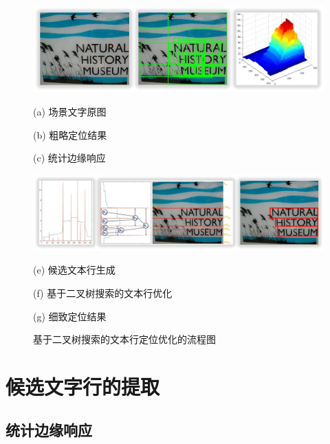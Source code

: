     \begin{figure}[!h]
    \centering
    \includegraphics[width=\textwidth]{./figures/c4_overview_1.jpg}
    \begin{minipage}[t]{0.23\linewidth}
    \centerline{ \small (a) 场景文字原图}
    \end{minipage}
    \begin{minipage}[t]{0.43\linewidth}
    \centerline{ \small (b) 粗略定位结果}
    \end{minipage}
    \begin{minipage}[t]{0.23\linewidth}
    \centerline{ \small (c) 统计边缘响应}
    \end{minipage}
    \includegraphics[width=\textwidth]{./figures/c4_overview_2.jpg}
    \begin{minipage}[t]{0.13\linewidth}
    \centerline{ \small (e) 候选文本行生成}
    \end{minipage}
    \begin{minipage}[t]{0.53\linewidth}
    \centerline{ \small (f) 基于二叉树搜索的文本行优化}
    \end{minipage}
    \begin{minipage}[t]{0.23\linewidth}
    \centerline{ \small (g) 细致定位结果}
    \end{minipage}
    \caption{基于二叉树搜索的文本行定位优化的流程图}
    \label{fig.c4_overview}
    \end{figure}

    \section{候选文字行的提取}

        \subsection{统计边缘响应}

